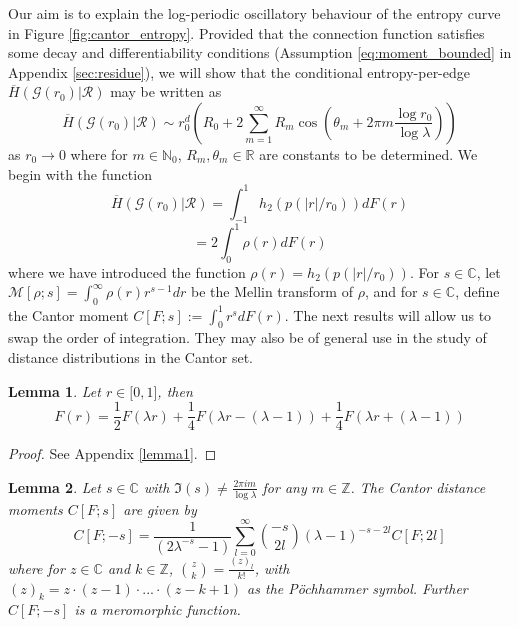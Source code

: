 \documentclass{article}
\newtheorem{lemma}{Lemma}
\newcommand{\graph}{\mathcal{G}}
\newcommand{\ttz}[0]{\rightarrow 0}
\begin{document}
Our aim is to explain the log-periodic oscillatory behaviour of the entropy curve in Figure \ref{fig:cantor_entropy}. Provided that the connection function satisfies some decay and differentiability conditions (Assumption \ref{eq:moment_bounded} in Appendix \ref{sec:residue}), we will show that the conditional entropy-per-edge $\overline{H}(\graph(r_0)|\mathcal{R})$ may be written as
\begin{equation}
    \overline{H}(\graph(r_0)|\mathcal{R}) \sim r_0^d\left(R_0 + 2\sum_{m=1}^{\infty} R_m \cos\left(\theta_m + 2\pi m \frac{\log r_0}{\log{\lambda}}\right)\right)
\end{equation}
as $r_0\ttz$ where for $m \in \mathbb{N}_0$, $R_m, \theta_m \in \mathbb{R}$ are constants to be determined. We begin with the function
\begin{equation}
    \overline{H}(\graph(r_0)|\mathcal{R}) = \int_{-1}^{1} h_2(p(|r|/r_0))dF(r) 
\end{equation}
\begin{equation}
    = 2\int_0^1 \rho(r) dF(r)
\end{equation}
where we have introduced the function $\rho(r) = h_2(p(|r|/r_0))$. For $s \in \mathbb{C}$, let $\mathcal{M}[\rho; s] = \int_0^{\infty} \rho(r)r^{s-1}dr$ be the Mellin transform of $\rho$, and for $s \in \mathbb{C}$, define the Cantor moment $C[F;s] := \int_0^1 r^{s}dF(r)$. The next results will allow us to swap the order of integration. They may also be of general use in the study of distance distributions in the Cantor set.

\begin{lemma}
    \label{thm:recursive}
    Let $r \in \mathbb[0,1]$, then
    \begin{equation}
        F(r) = \frac{1}{2}F(\lambda r) + \frac{1}{4}F(\lambda r-(\lambda - 1)) + \frac{1}{4}F(\lambda r+(\lambda-1))
    \end{equation}
\end{lemma}
\begin{proof}
See Appendix \ref{lemma1}.
\end{proof}

\begin{lemma}
    \label{thm:moments}
    Let $s \in \mathbb{C}$ with $\Im(s) \neq \frac{2\pi i m}{\log \lambda}$ for any $m \in \mathbb{Z}$. The Cantor distance moments $C[F;s]$ are given by
    \begin{equation}
        C[F;-s] = \frac{1}{(2\lambda^{-s}-1)}\sum_{l=0}^{\infty}\binom{-s}{2l}(\lambda-1)^{-s-2l}C[F;2l]
    \end{equation}
    where for $z \in \mathbb{C}$ and $k \in \mathbb{Z}$, $\binom{z}{k} = \frac{(z)_l}{k!}$, with $(z)_k = z\cdot(z-1)\cdot...\cdot(z-k+1)$ as the P\"ochhammer symbol. Further $C[F;-s]$ is a meromorphic function. 
\end{lemma}
\end{document}
